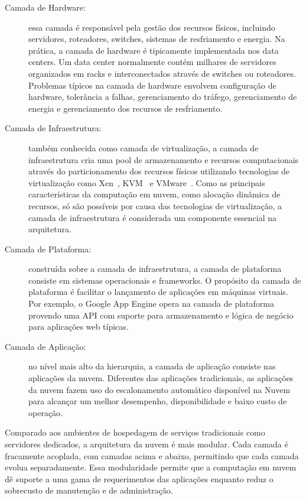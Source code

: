 \begin{description}

	\item[Camada de Hardware:] essa camada é responsável pela gestão dos recursos físicos, incluindo servidores, roteadores, switches, sistemas de resfriamento e energia. Na prática, a camada de      hardware é tipicamente implementada nos data centers. Um data center normalmente contém milhares de servidores organizados em racks e interconectados através de switches ou roteadores. Problemas típicos na camada de hardware envolvem configuração de hardware, tolerância a falhas, gerenciamento do tráfego, gerenciamento de energia e gerenciamento dos recursos de resfriamento.

	\item[Camada de Infraestrutura:] também conhecida como camada de virtualização, a camada de infraestrutura cria uma pool de armazenamento e recursos computacionais através do particionamento dos recursos físicos utilizando tecnologias de virtualização como  Xen~\cite{Xen:Online}, KVM~\cite{KVM:Online} e VMware~\cite{VMware:Online}. Como as principais características da computação em nuvem, como alocação dinâmica de recursos, só são possíveis por causa das tecnologias de virtualização, a camada de infraestrutura é considerada um componente essencial na arquitetura.

	\item[Camada de Plataforma:] construída sobre a camada de infraestrutura, a camada de plataforma consiste em sistemas operacionais e frameworks. O propósito da camada de plataforma é facilitar o lançamento de aplicações em máquinas virtuais. Por exemplo, o Google App Engine opera na camada de plataforma provendo uma API com suporte para armazenamento e lógica de negócio para aplicações web típicas. 

	\item[Camada de Aplicação:] no nível mais alto da hierarquia, a camada de aplicação consiste nas aplicações da nuvem. Diferentes das aplicações tradicionais, as aplicações da nuvem fazem uso do escalonamento automático disponível na Nuvem para alcançar um melhor desempenho, disponibilidade e baixo custo de operação.

\end{description}

Comparado aos ambientes de hospedagem de serviços tradicionais como servidores dedicados, a arquitetura da nuvem é mais modular. Cada camada é fracamente acoplada, com camadas acima e abaixo, permitindo que cada camada evolua separadamente. Essa modularidade permite que a computação em nuvem dê suporte a uma gama de requerimentos das aplicações enquanto reduz o sobrecusto de manutenção e de administração.

